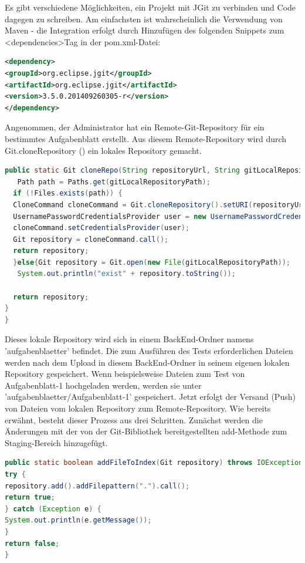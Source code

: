 \documentclass[a4paper,12pt,oneside]{book}
\begin{document}
Es gibt verschiedene Möglichkeiten, ein Projekt mit JGit zu verbinden und Code dagegen zu schreiben. Am einfachsten ist wahrscheinlich die Verwendung von Maven - die Integration erfolgt durch Hinzufügen des folgenden Snippets zum <dependencies>Tag in der pom.xml-Datei:
\begin{lstlisting}[language=XML,caption=JGit-dependency ]
<dependency>
<groupId>org.eclipse.jgit</groupId>
<artifactId>org.eclipse.jgit</artifactId>
<version>3.5.0.201409260305-r</version>
</dependency>
\end{lstlisting} 
Angenommen, der Administrator hat ein Remote-Git-Repository für ein bestimmtes Aufgabenblatt erstellt. Aus diesem Remote-Repository wird durch Git.cloneRepository () ein lokales Repository gemacht.
\begin{lstlisting}[language=JAVA,caption=clone Repository ]
public static Git cloneRepo(String repositoryUrl, String gitLocalRepositoryPath, String tfsUser, String password) throws GitAPIException, IOException {
   Path path = Paths.get(gitLocalRepositoryPath);
  if (!Files.exists(path)) {
  CloneCommand cloneCommand = Git.cloneRepository().setURI(repositoryUrl).setDirectory(new File(gitLocalRepositoryPath));
  UsernamePasswordCredentialsProvider user = new UsernamePasswordCredentialsProvider(tfsUser, password);
  cloneCommand.setCredentialsProvider(user);
  Git repository = cloneCommand.call();
  return repository;
  }else{Git repository = Git.open(new File(gitLocalRepositoryPath));
   System.out.println("exist" + repository.toString());

  return repository;
}
}
\end{lstlisting} 
Dieses lokale Repository wird sich in einem BackEnd-Ordner namens 'aufgabenblaetter' befindet. Die zum Ausführen des Tests erforderlichen Dateien werden nach dem Upload in diesem BackEnd-Ordner in seinem eigenen lokalen Repository gespeichert. Wenn beispielsweise Dateien zum Test von Aufgabenblatt-1 hochgeladen werden, werden sie unter 'aufgabenblaetter/Aufgabenblatt-1' gespeichert.
\newline
Jetzt erfolgt der Versand (Push) von Dateien vom lokalen Repository zum Remote-Repository. Wie bereits erwähnt, besteht dieser Prozess aus drei Schritten. Zunächst werden die Änderungen mit der von der Git-Bibliothek bereitgestellten add-Methode zum Staging-Bereich hinzugefügt.
\begin{lstlisting}[language=JAVA,caption=Add File To Index ]
public static boolean addFileToIndex(Git repository) throws IOException, GitAPIException {
try {
repository.add().addFilepattern(".").call();
return true;
} catch (Exception e) {
System.out.println(e.getMessage());
}
return false;
}
\end{lstlisting} 
\end{document}
